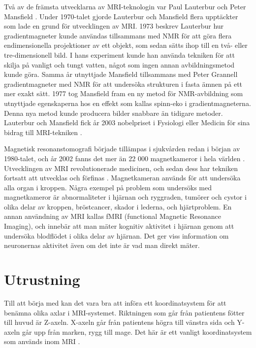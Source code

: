 \documentclass[11pt, a4paper]{article}
\begin{document}
Två av de främsta utvecklarna av MRI-teknologin var Paul Lauterbur och Peter Mansfield \parencite{mri_nobelpris_pressmeddelande}. Under 1970-talet gjorde Lauterbur och Mansfield flera upptäckter som lade en grund för utvecklingen av MRI. 1973 beskrev Lauterbur hur gradientmagneter kunde användas tillsammans med NMR för att göra flera endimensionella projektioner av ett objekt, som sedan sätts ihop till en två- eller tre-dimensionell bild. I hans experiment kunde han använda tekniken för att skilja på vanligt och tungt vatten, något som ingen annan avbildningsmetod kunde göra. Samma år utnyttjade Mansfield tillsammans med Peter Grannell gradientmagneter med NMR för att undersöka strukturen i fasta ämnen på ett mer exakt sätt. 1977 tog Mansfield fram en ny metod för NMR-avbildning som utnyttjade egenskaperna hos en effekt som kallas spinn-eko i gradientmagneterna. Denna nya metod kunde producera bilder snabbare än tidigare metoder. Lauterbur och Mansfield fick år 2003 nobelpriset i Fysiologi eller Medicin för sina bidrag till MRI-tekniken \parencite{mri_nobelpris_pressmeddelande}.

Magnetisk resonanstomografi började tillämpas i sjukvården redan i början av 1980-talet, och år 2002 fanns det mer än 22 000 magnetkameror i hela världen \parencite{mri_nobelpris_pressmeddelande}. Utvecklingen av MRI revolutionerade medicinen, och sedan dess har tekniken fortsatt att utvecklas och förfinas \parencite{mri_facts}. Magnetkameran används för att undersöka alla organ i kroppen. Några exempel på problem som undersöks med magnetkameror är abnormaliteter i hjärnan och ryggraden, tumörer och cystor i olika delar av kroppen, bröstcancer, skador i lederna, och hjärtproblem. En annan användning av MRI kallas fMRI (functional Magnetic Resonance Imaging), och innebär att man mäter kognitiv aktivitet i hjärnan genom att undersöka blodflödet i olika delar av hjärnan. Det ger viss information om neuronernas aktivitet även om det inte är vad man direkt mäter.

\clearpage
\section{Utrustning}
Till att börja med kan det vara bra att införa ett koordinatsystem för att benämna olika axlar i MRI-systemet. Riktningen som går från patientens fötter till huvud är Z-axeln. X-axeln går från patientens högra till vänstra sida och Y-axeln går upp från marken, rygg till mage. Det här är ett vanligt koordinatsystem som används inom MRI \parencite{mri_for_radiologists}.
\end{document}

